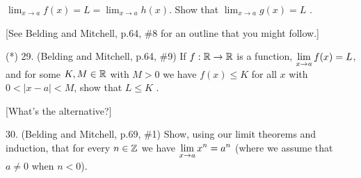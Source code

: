 \documentclass[12pt]{article}
\begin{document}
\begin{description}
\item{\spc} $\displaystyle \lim_{x\rightarrow a}f(x)=L=\lim_{x\rightarrow a}h(x)$.
Show that $\displaystyle \lim_{x\rightarrow a}g(x)=L$ .

\ssk

\item{\spc} [See Belding and Mitchell, p.64, \#8 for an outline that you might follow.]

\msk

\item{(*) 29.} (Belding and Mitchell, p.64, \#9) If $f:{\mathbb R}\rightarrow{\mathbb R}$ is a function,
$\displaystyle\lim_{x\rightarrow a} f(x)=L$, and for some $K,M\in{\mathbb R}$ with $M>0$ we have $f(x)\leq K$ for
all $x$ with $0<|x-a|<M$, show that $L\leq K$ . 

\ssk

\item{\spc} [What's the alternative?]

\msk

\item{30.} (Belding and Mitchell, p.69, \#1) Show, using our limit theorems and induction, that
for every $n\in{\mathbb Z}$ we have $\displaystyle\lim_{x\rightarrow a} x^n = a^n$ (where we assume that $a\neq 0$ when 
$n<0$).

\msk


\end{description}
\vfill
\end{document}
